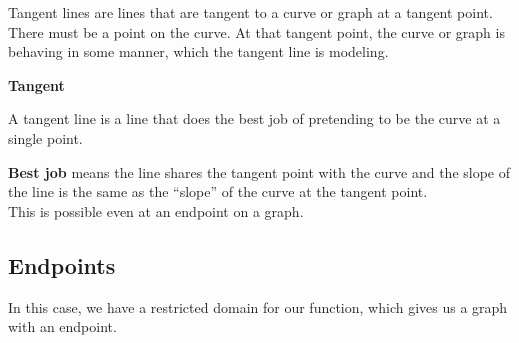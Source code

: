 \documentclass{ximera}
\begin{document}
 
 

Tangent lines are lines that are tangent to a curve or graph at a tangent point. There must be a point on the curve. At that tangent point, the curve or graph is behaving in some manner, which the tangent line is modeling.  \\

\begin{idea} \textbf{\textcolor{blue!55!black}{Tangent}}

A tangent line is a line that does the best job of pretending to be the curve at a single point.
\end{idea}
\textbf{Best job} means the line shares the tangent point with the curve and the slope of the line is the same as the ``slope'' of the curve at the tangent point. \\





This is possible even at an endpoint on a graph.





\subsection*{Endpoints}



In this case, we have a restricted domain for our function, which gives us a graph with an endpoint. \\




\begin{image}
\end{image}
\end{document}
